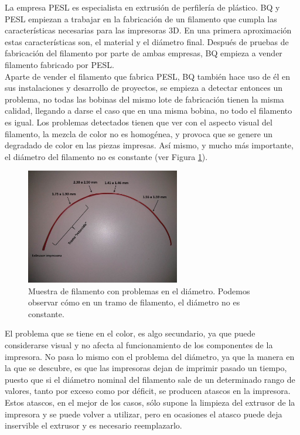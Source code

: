 La empresa PESL es especialista en extrusión de perfilería de plástico. BQ y PESL empiezan a trabajar en la fabricación de un filamento que cumpla las características necesarias para las impresoras 3D. En una primera aproximación estas características son, el material y el diámetro final. Después de pruebas de fabricación del filamento por parte de ambas empresas, BQ empieza a vender filamento fabricado por PESL.\\

Aparte de vender el filamento que fabrica PESL, BQ también hace uso de él en sus instalaciones y desarrollo de proyectos, se empieza a detectar entonces un problema, no todas las bobinas del mismo lote de fabricación tienen la misma calidad, llegando a darse el caso que en una misma bobina, no todo el filamento es igual. Los problemas detectados tienen que ver con el aspecto visual del filamento, la mezcla de color no es homogénea, y provoca que se genere un degradado de color en las piezas impresas. Así mismo, y mucho más importante, el diámetro del filamento no es constante (ver Figura \ref{fig:muestra_filamento}).

\begin{figure}[h!]
    \centering
    \includegraphics[width=0.6\textwidth]{images/atasco_rojo.jpg}
    \caption[Muestra de filamento con problemas en el diámetro]{Muestra de filamento con problemas en el diámetro. Podemos observar cómo en un tramo de filamento, el diámetro no es constante.}
    \label{fig:muestra_filamento}
\end{figure}

El problema que se tiene en el color, es algo secundario, ya que puede considerarse visual y no afecta al funcionamiento de los componentes de la impresora. No pasa lo mismo con el problema del diámetro, ya que la manera en la que se descubre, es que las impresoras dejan de imprimir pasado un tiempo, puesto que si el diámetro nominal del filamento sale de un determinado rango de valores, tanto por exceso como por déficit, se producen atascos en la impresora. Estos atascos, en el mejor de los casos, sólo supone la limpieza del extrusor de la impresora y se puede volver a utilizar, pero en ocasiones el atasco puede deja inservible el extrusor y es necesario reemplazarlo.\\

